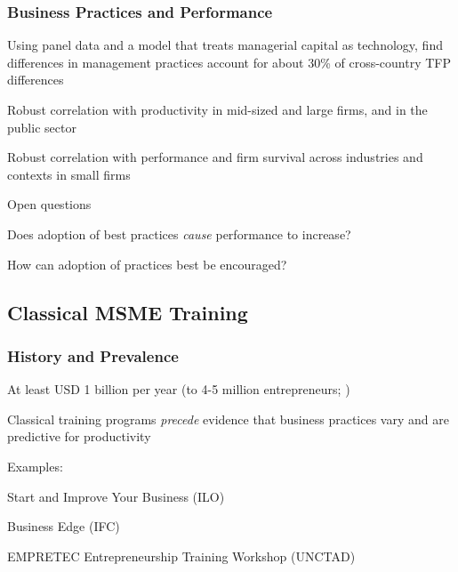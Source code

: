 \documentclass[hideothersubsections, usenames,dvipsnames,11pt]{beamer}
\newenvironment{itemize_2pt}{\itemize\addtolength{\itemsep}{2pt}}{\enditemize}
\begin{document}
\begin{frame}
\frametitle{Business Practices and Performance}

	Using panel data and a model that treats managerial capital as technology, \citet{Bloom2016} find differences in management practices account for about 30\% of cross-country TFP differences
	\begin{itemize_2pt}
		\item Robust correlation with productivity in \textcolor{bdf}{mid-sized and large firms}, and in the \textcolor{bdf}{public sector} \citep{Bloom2015,Bloom2020} %
		\item Robust correlation with performance and firm survival across industries and contexts in \textcolor{bdf}{small firms} \citep{McKenzie2017}
		\end{itemize_2pt}
		
\vspace{0.1in}	
	
	Open questions
	\begin{itemize_2pt}
		\item Does adoption of best practices \emph{cause} performance to increase?
		\item How can adoption of practices best be encouraged?
	\end{itemize_2pt}	
	
\end{frame}


\subsection{Classical MSME Training}

\begin{frame}
\frametitle{History and Prevalence}
	\begin{itemize_2pt}
		\item At least \textcolor{bdf}{USD 1 billion per year} (to 4-5 million entrepreneurs; \citet{McKenzie2021})
		\item Classical training programs \emph{precede} evidence that business practices vary and are predictive for productivity
		
		\vspace{0.5em}		
		
		\item Examples:
		\begin{itemize_2pt}
			\item Start and Improve Your Business (ILO)
			\item Business Edge (IFC)
			\item EMPRETEC Entrepreneurship Training Workshop (UNCTAD)
		\end{itemize_2pt} 
	\end{itemize_2pt}
\end{frame}
\end{document}
